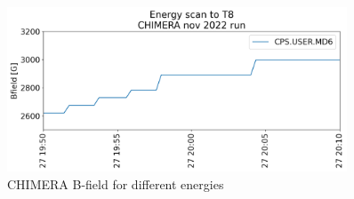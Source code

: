 \begin{figure}[h]
\includegraphics[width=0.9\textwidth]{images/energy_scan_timestamp_chimera 1.png}
\caption{CHIMERA B-field for different energies}
\label{fig:bfield}
\end{figure}

